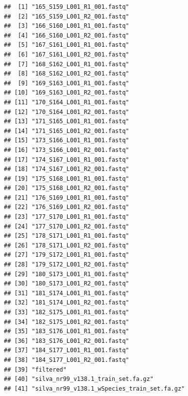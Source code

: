 \documentclass[
]{article}
\begin{document}
\begin{verbatim}
##  [1] "165_S159_L001_R1_001.fastq"                
##  [2] "165_S159_L001_R2_001.fastq"                
##  [3] "166_S160_L001_R1_001.fastq"                
##  [4] "166_S160_L001_R2_001.fastq"                
##  [5] "167_S161_L001_R1_001.fastq"                
##  [6] "167_S161_L001_R2_001.fastq"                
##  [7] "168_S162_L001_R1_001.fastq"                
##  [8] "168_S162_L001_R2_001.fastq"                
##  [9] "169_S163_L001_R1_001.fastq"                
## [10] "169_S163_L001_R2_001.fastq"                
## [11] "170_S164_L001_R1_001.fastq"                
## [12] "170_S164_L001_R2_001.fastq"                
## [13] "171_S165_L001_R1_001.fastq"                
## [14] "171_S165_L001_R2_001.fastq"                
## [15] "173_S166_L001_R1_001.fastq"                
## [16] "173_S166_L001_R2_001.fastq"                
## [17] "174_S167_L001_R1_001.fastq"                
## [18] "174_S167_L001_R2_001.fastq"                
## [19] "175_S168_L001_R1_001.fastq"                
## [20] "175_S168_L001_R2_001.fastq"                
## [21] "176_S169_L001_R1_001.fastq"                
## [22] "176_S169_L001_R2_001.fastq"                
## [23] "177_S170_L001_R1_001.fastq"                
## [24] "177_S170_L001_R2_001.fastq"                
## [25] "178_S171_L001_R1_001.fastq"                
## [26] "178_S171_L001_R2_001.fastq"                
## [27] "179_S172_L001_R1_001.fastq"                
## [28] "179_S172_L001_R2_001.fastq"                
## [29] "180_S173_L001_R1_001.fastq"                
## [30] "180_S173_L001_R2_001.fastq"                
## [31] "181_S174_L001_R1_001.fastq"                
## [32] "181_S174_L001_R2_001.fastq"                
## [33] "182_S175_L001_R1_001.fastq"                
## [34] "182_S175_L001_R2_001.fastq"                
## [35] "183_S176_L001_R1_001.fastq"                
## [36] "183_S176_L001_R2_001.fastq"                
## [37] "184_S177_L001_R1_001.fastq"                
## [38] "184_S177_L001_R2_001.fastq"                
## [39] "filtered"                                  
## [40] "silva_nr99_v138.1_train_set.fa.gz"         
## [41] "silva_nr99_v138.1_wSpecies_train_set.fa.gz"
\end{verbatim}
\end{document}
